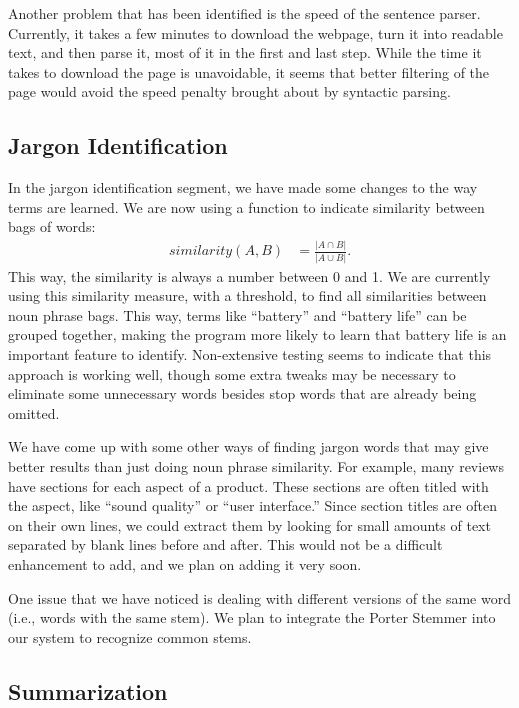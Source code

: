 \documentclass{article}
\begin{document}
Another problem that has been identified is the speed of the sentence parser.
Currently, it takes a few minutes to download the webpage, turn it into readable
text, and then parse it, most of it in the first and last step. While the time
it takes to download the page is unavoidable, it seems that better filtering of
the page would avoid the speed penalty brought about by syntactic parsing.

\subsection{Jargon Identification} %

In the jargon identification segment, we have made some changes to the way terms
are learned.  We are now using a function to indicate similarity between bags of
words:\begin{align*}
	similarity(A, B) &= \frac{|A\cap B|}{|A\cup B|}.
\end{align*}This way, the similarity is always a number between 0 and 1.  We are
currently using this similarity measure, with a threshold, to find all similarities
between noun phrase bags.  This way, terms like ``battery'' and ``battery life''
can be grouped together, making the program more likely to learn that battery life
is an important feature to identify.  Non-extensive testing seems to indicate that
this approach is working well, though some extra tweaks may be necessary to
eliminate some unnecessary words besides stop words that are already being omitted.

We have come up with some other ways of finding jargon words that may give better
results than just doing noun phrase similarity.  For example, many reviews have 
sections for each aspect of a product.  These sections are often titled with the
aspect, like ``sound quality'' or ``user interface.''  Since section titles are
often on their own lines, we could extract them by looking for small amounts of
text separated by blank lines before and after.  This would not be a difficult 
enhancement to add, and we plan on adding it very soon.

One issue that we have noticed is dealing with different versions of the same word
(i.e., words with the same stem).  We plan to integrate the Porter Stemmer
\cite{porter} into our system to recognize common stems.


\subsection{Summarization} %
\end{document}
